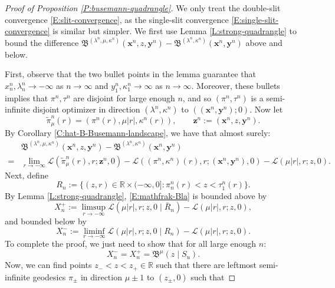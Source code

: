 \documentclass[10pt,a4paper]{amsart}
\newcommand{\R}{\mathbb{R}}
\newcommand{\X}{\times}
\newcommand{\bx}{\mathbf{x}}
\newcommand{\by}{\mathbf{y}}
\newcommand{\bz}{\mathbf{z}}
\newcommand{\cL}{\mathcal{L}}
\newcommand{\la}{\lambda}
\begin{document}
\begin{proof}[Proof of Proposition \ref{P:busemann-quadrangle}]
	We only treat the double-slit convergence \eqref{E:slit-convergence}, as the single-slit convergence \eqref{E:single-slit-convergence} is similar but simpler.
	We first use Lemma \ref{L:strong-quadrangle} to bound the difference $\mathfrak B^{(\la^n, \mu, \kappa^n)}(\bx^n, z, \by^n) - \mathfrak B^{(\la^n, \kappa^n)}(\bx^n, \by^n)$ above and below. 
	
	First, observe that the two bullet points in the lemma guarantee that $x^n_n, \la^n_n \to -\infty$ as $n \to \infty$ and $y^n_1, \kappa^n_1 \to \infty$ as $n \to \infty$. Moreover, these bullets implies that $\pi^n, \tau^n$ are disjoint for large enough $n$, and so $(\pi^n, \tau^n)$ is a semi-infinite disjoint optimizer in direction $(\la^n, \kappa^n)$ to $((\bx^n, \by^n); 0)$. Now let
	$$
	\tilde \pi^n_\mu(r) = (\pi^n(r), \mu |r|, \kappa^n(r)), \qquad \bz^n := (\bx^n, z, \by^n).
	$$
	By Corollary \ref{C:hat-B-Busemann-landscape}, we have that almost surely:
	\begin{equation}
	\label{E:mathfrak-Bla}
	\begin{split}
&\mathfrak B^{(\la^n, \mu, \kappa^n)}(\bx^n, z, \by^n) - \mathfrak B^{(\la^n, \kappa^n)}(\bx^n, \by^n) \\
= &\lim_{r \to -\infty} \cL(\tilde \pi^n_\mu(r), r; \bz^n, 0) - \cL((\pi^n, \kappa^n)(r), r; (\bx^n, \by^n), 0) - \cL(\mu |r|, r; z, 0).
	\end{split}
	\end{equation}
	Next, define
	$$
	R_n := \{(z, r) \in \R \X (-\infty, 0] : \pi^n_n(r) < z < \tau^n_1(r)\}.
	$$
	By Lemma \ref{L:strong-quadrangle}, \eqref{E:mathfrak-Bla} is bounded above by
	\begin{equation}
	\label{E:limsup-above}
	X_n^+ := \limsup_{r \to -\infty} \cL(\mu |r|, r; z, 0 \mid \bar R_n) - \cL(\mu |r|, r; z, 0),
	\end{equation}
	and bounded below by
		\begin{equation}
	\label{E:liminf-below}
	X_n^- := \liminf_{r \to -\infty} \cL(\mu |r|, r; z, 0 \mid R_n) - \cL(\mu |r|, r; z, 0).
	\end{equation}
	To complete the proof, we just need to show that for all large enough $n$:
	\begin{equation}
	\label{E:X-limit}
X_n^- = X_n^+ = \mathfrak B^{\mu}(z \mid S_u).
	\end{equation}
	Now, we can find points $z_- < z < z_+ \in \R$ such that there are leftmost semi-infinite geodesics $\pi_\pm$ in direction $\mu \pm 1$ to $(z_\pm, 0)$ such that

\end{proof}
\end{document}
